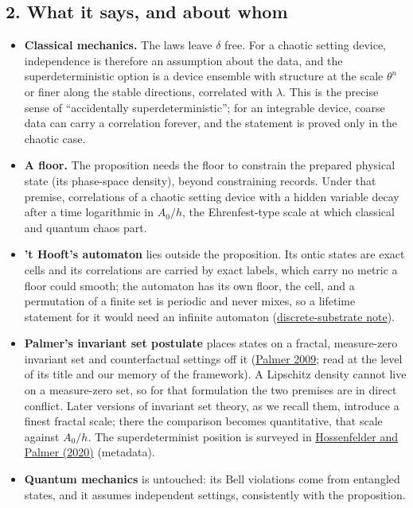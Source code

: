 \documentclass[11pt,a4paper]{article}
\newcommand{\tightlist}{\setlength{\itemsep}{0pt}\setlength{\parskip}{0pt}}
\begin{document}
\hypertarget{what-it-says-and-about-whom}{%
\subsection{2. What it says, and about
whom}\label{what-it-says-and-about-whom}}

\begin{itemize}
\tightlist
\item
  \textbf{Classical mechanics.} The laws leave \(\delta\) free. For a
  chaotic setting device, independence is therefore an assumption about
  the data, and the superdeterministic option is a device ensemble with
  structure at the scale \(\theta^n\) or finer along the stable
  directions, correlated with \(\lambda\). This is the precise sense of
  ``accidentally superdeterministic''; for an integrable device, coarse
  data can carry a correlation forever, and the statement is proved only
  in the chaotic case.
\item
  \textbf{A floor.} The proposition needs the floor to constrain the
  prepared physical state (its phase-space density), beyond constraining
  records. Under that premise, correlations of a chaotic setting device
  with a hidden variable decay after a time logarithmic in \(A_0/h\),
  the Ehrenfest-type scale at which classical and quantum chaos part.
\item
  \textbf{'t Hooft's automaton} lies outside the proposition. Its ontic
  states are exact cells and its correlations are carried by exact
  labels, which carry no metric a floor could smooth; the automaton has
  its own floor, the cell, and a permutation of a finite set is periodic
  and never mixes, so a lifetime statement for it would need an infinite
  automaton
  (\href{ancient-cuts-provenance.md\#modern-discrete-state-and-operator-comparisons}{discrete-substrate
  note}).
\item
  \textbf{Palmer's invariant set postulate} places states on a fractal,
  measure-zero invariant set and counterfactual settings off it
  (\href{https://doi.org/10.1098/rspa.2009.0080}{Palmer 2009}; read at
  the level of its title and our memory of the framework). A Lipschitz
  density cannot live on a measure-zero set, so for that formulation the
  two premises are in direct conflict. Later versions of invariant set
  theory, as we recall them, introduce a finest fractal scale; there the
  comparison becomes quantitative, that scale against \(A_0/h\). The
  superdeterminist position is surveyed in
  \href{https://doi.org/10.3389/fphy.2020.00139}{Hossenfelder and Palmer
  (2020)} (metadata).
\item
  \textbf{Quantum mechanics} is untouched: its Bell violations come from
  entangled states, and it assumes independent settings, consistently
  with the proposition.
\end{itemize}
\end{document}
